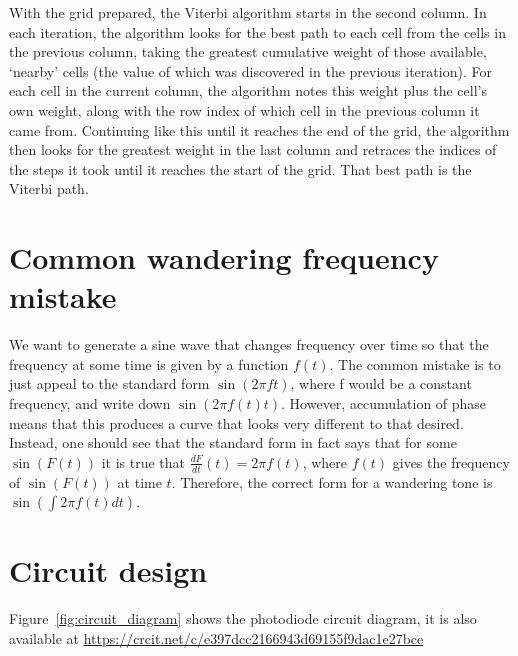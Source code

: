 \documentclass[prb,preprint]{revtex4-1}
\begin{document}
With the grid prepared, the Viterbi algorithm starts in the second column. In each iteration, the algorithm looks for the best path to each cell from the cells in the previous column, taking the greatest cumulative weight of those available, ‘nearby’ cells (the value of which was discovered in the previous iteration).
For each cell in the current column, the algorithm notes this weight plus the cell’s own weight, along with the row index of which cell in the previous column it came from.
Continuing like this until it reaches the end of the grid, the algorithm then looks for the greatest weight in the last column and retraces the indices of the steps it took until it reaches the start of the grid. That best path is the Viterbi path.


\section{Common wandering frequency mistake}
\label{app:phase_gotcha}

We want to generate a sine wave that changes frequency over time so that the frequency at some time is given by a function $f(t)$. The common mistake is to just appeal to the standard form $\sin{(2 \pi f t)}$, where f would be a constant frequency, and write down $\sin{(2 \pi f(t) t)}$. However, accumulation of phase means that this produces a curve that looks very different to that desired. Instead, one should see that the standard form in fact says that for some $\sin{(F(t))}$ it is true that $\frac{dF}{dt}(t) = 2 \pi f(t)$, where $f(t)$ gives the frequency of $\sin{(F(t))}$ at time $t$. Therefore, the correct form for a wandering tone is $\sin{(\int{2 \pi f(t) dt})}$.


\section{Circuit design}
\label{app:circuit_diagram}

Figure~\ref{fig:circuit_diagram} shows the photodiode circuit diagram, it is also available at \url{https://crcit.net/c/e397dcc2166943d69155f9dac1e27bce}
\end{document}
